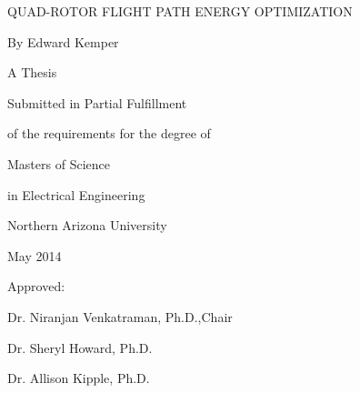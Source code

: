 \documentclass[12pt, letterpaper, oneside]{Thesis} %
\title{\ttitle} %
\begin{document}
\frontmatter %


\pagestyle{plain} %

\newcommand{\HRule}{\rule{\linewidth}{0.5mm}} %
\newcommand{\p}{\partial}
\newcommand{\spa}{\text{ }}
\newcommand{\cc}{\mathfrak{C}} %
\hypersetup{pdfsubject=\subjectname}
\hypersetup{pdfauthor=\authornames}
\hypersetup{pdfkeywords=\keywordnames}


\begin{titlepage}
\begin{center}

QUAD-ROTOR FLIGHT PATH ENERGY OPTIMIZATION
\vspace{15 mm}

By Edward Kemper

A Thesis

Submitted in Partial Fulfillment

of the requirements for the degree of

Masters of Science

in Electrical Engineering
\vspace{15 mm}

Northern Arizona University

May 2014
\vspace{20 mm}

Approved:

Dr. Niranjan Venkatraman, Ph.D.,Chair

Dr. Sheryl Howard, Ph.D.

Dr. Allison Kipple, Ph.D.



\end{center}
\clearpage
\thispagestyle{empty}
\end{titlepage}
\end{document}

